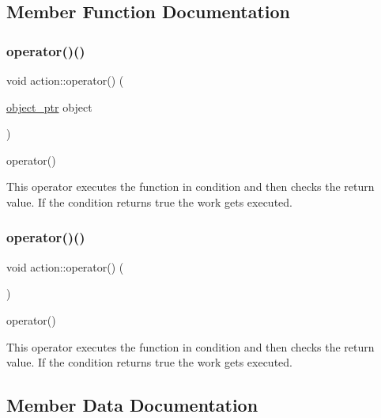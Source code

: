 \subsection{Member Function Documentation}
\mbox{\label{classaction_ab4f8d0f7552450455977d09a889c18c7}} 
\subsubsection{\texorpdfstring{operator()()}{operator()()}\hspace{0.1cm}{\footnotesize\ttfamily [1/2]}}
{\footnotesize\ttfamily void action\+::operator() (\begin{DoxyParamCaption}\item[{\hyperlink{drawable_8hpp_aab5add95f06d2ba25dbfed8eb07274fa}{object\+\_\+ptr}}]{object }\end{DoxyParamCaption})\hspace{0.3cm}{\ttfamily [inline]}}



operator() 

This operator executes the function in condition and then checks the return value. If the condition returns true the work gets executed. \mbox{\label{classaction_a92c003677656b5b3e6e58b19376e6b04}} 
\subsubsection{\texorpdfstring{operator()()}{operator()()}\hspace{0.1cm}{\footnotesize\ttfamily [2/2]}}
{\footnotesize\ttfamily void action\+::operator() (\begin{DoxyParamCaption}{ }\end{DoxyParamCaption})\hspace{0.3cm}{\ttfamily [inline]}}



operator() 

This operator executes the function in condition and then checks the return value. If the condition returns true the work gets executed. 

\subsection{Member Data Documentation}
\mbox{\label{classaction_a949abf979a5255f54e88a6a4273afebe}} 
